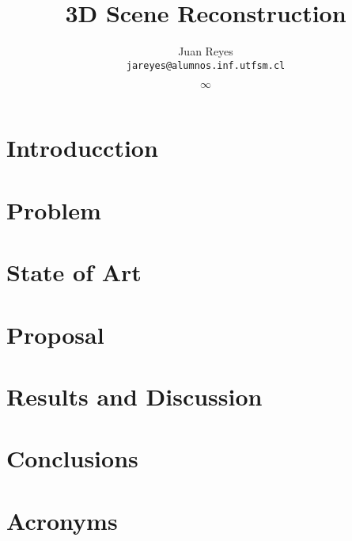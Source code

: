 \documentclass[spanish,english,12pt,letterpaper,oneside]{book}
\title{3D Scene Reconstruction}
\author{
  Juan Reyes \\ \texttt{jareyes@alumnos.inf.utfsm.cl}
}
\date{$\infty$}
\begin{document}
\frontmatter




\tableofcontents

{}
\listoffigures
{}
\listoftables

\mainmatter

\chapter{Introducction}
\label{introduccion}


\chapter{Problem}


\chapter{State of Art}


\chapter{Proposal}







\chapter{Results and Discussion}
%


\chapter{Conclusions}
\label{conclusions}


\appendix



\chapter{Acronyms}
\label{acronyms}





\backmatter



\end{document}
